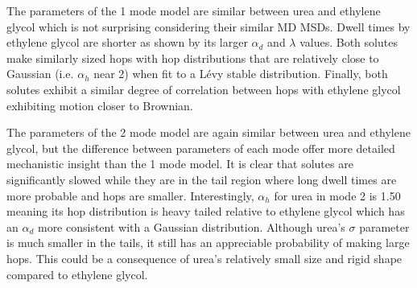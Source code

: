 \documentclass{article}
\begin{document}
  The parameters of the 1 mode model are similar between urea and ethylene glycol which 
  is not surprising considering their similar MD MSDs. Dwell times by 
  ethylene glycol are shorter as shown by its larger $\alpha_d$ and $\lambda$ values. Both
  solutes make similarly sized hops with hop distributions that are relatively close 
  to Gaussian (i.e. $\alpha_h$ near 2) when fit to a L\'evy stable distribution. Finally,
  both solutes exhibit a similar degree of correlation between hops with ethylene glycol
  exhibiting motion closer to Brownian. 
  
  The parameters of the 2 mode model are again similar between urea and ethylene glycol, 
  but the difference between parameters of each mode offer more detailed mechanistic
  insight than the 1 mode model. It is clear that solutes are significantly slowed while
  they are in the tail region where long dwell times are more probable and hops are 
  smaller. Interestingly, $\alpha_h$ for urea in mode 2 is 1.50 meaning its hop distribution is
  heavy tailed relative to ethylene glycol which has an $\alpha_d$ more consistent 
  with a Gaussian distribution. Although urea's $\sigma$ parameter is much smaller in 
  the tails, it still has an appreciable probability of making large hops. This could 
  be a consequence of urea's 
  relatively small size and rigid shape compared to ethylene glycol.
  
\end{document}
